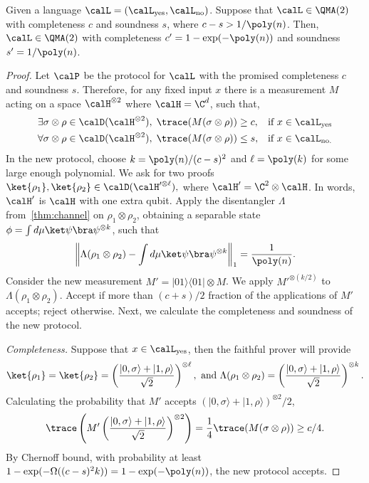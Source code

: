 \begin{theorem}
Given a language $\calL=(\calL_{\mathrm{yes}}, \calL_{\mathrm{no}})$. Suppose that $\calL \in \QMA(2)$ with completeness $c$ and soundness $s$, where $c-s>1/\poly(n)$. Then, $\calL\in\QMA(2)$ with completeness $c'=1-\exp(-\poly(n))$ and soundness $s'=1/\poly(n)$.
\end{theorem}

\begin{proof}
Let $\calP$ be the protocol for $\calL$ with the promised completeness $c$
and soundness $s$. Therefore, for any fixed input $x$ there is a measurement $M$ acting on a space $\calH^{\otimes 2}$ where $\calH=\C^{d}$, such that,
\begin{align}
        &\exists \sigma\otimes \rho \in \calD(\calH^{\otimes 2}), \; 
            \trace(M (\sigma\otimes\rho) ) \ge c,
                &\text{if } x\in \calL_{\mathrm{yes}}
        \nonumber \\
        &\forall \sigma\otimes\rho \in \calD(\calH^{\otimes 2}), \; 
            \trace(M (\sigma\otimes\rho) ) \le s,
                &\text{if } x\in \calL_{\mathrm{no}.}
        \nonumber
\end{align}
In the new protocol, choose $k=\poly(n)/(c-s)^2$ and $\ell=\poly(k)$ for some large enough polynomial. We ask for two proofs $\ket{\rho_1}, \ket{\rho_2} \in \calD(\calH'^{\otimes\ell}),$ where $\calH'=\C^2 \otimes \calH$. In words, $\calH'$ is $\calH$ with one extra qubit. Apply the disentangler $\Lambda$ from~\cref{thm:channel} on $\rho_1\otimes\rho_2$, obtaining a separable state $\phi=\int d\mu \ket\psi\bra\psi ^{\otimes k}$, such that
\begin{equation}
    \left\|\Lambda(\rho_1\otimes\rho_2)-\int d\mu \ket\psi\bra\psi ^{\otimes k}\right\|_1 = \frac{1}{\poly(n)}.\label{eq:gap-amp-error}
\end{equation}
Consider the new measurement $M'=|01\rangle\langle01|\otimes M$. We apply $M'^{\otimes (k/2)}$ to $\Lambda(\rho_1\otimes\rho_2)$. Accept if more than $(c+s)/2$ fraction of the applications of $M'$ accepts; reject otherwise. Next, we calculate the completeness and soundness of the new protocol.

\emph{Completeness.} Suppose that $x\in\calL_{\mathrm{yes}}$, then the faithful prover will provide
\[
    \ket{\rho_1}=\ket{\rho_2}=\left(\frac{|0,\sigma\rangle+|1,\rho\rangle}{\sqrt{2}}\right)^{\otimes \ell}, \text{ and } \Lambda(\rho_1\otimes\rho_2)=\left(\frac{|0,\sigma\rangle+|1,\rho\rangle}{\sqrt{2}}\right)^{\otimes k}.
\]
Calculating the probability that $M'$ accepts $(|0,\sigma\rangle+|1,\rho\rangle)^{\otimes 2}/2$,
\[
    \trace\left( M' \left(\frac{|0,\sigma\rangle+|1,\rho\rangle}{\sqrt2}\right)^{\otimes 2}
    \right) = \frac{1}{4}\trace( M (\sigma\otimes \rho))\ge c/4.
\]
By Chernoff bound, with probability at least $1-\exp(-\Omega((c-s)^2 k))=1-\exp(-\poly(n))$, the new protocol accepts.


\end{proof}
